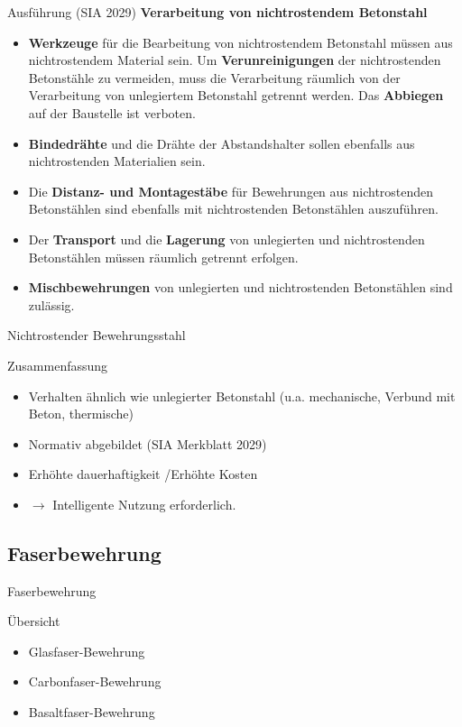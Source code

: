 \begin{frame}{Ausführung (SIA 2029)}
    \textbf{Verarbeitung von nichtrostendem Betonstahl}
    \begin{itemize}
        \item[\textbullet]  \textbf{Werkzeuge} für die Bearbeitung von nichtrostendem Betonstahl müssen aus nichtrostendem Material sein.
              Um \textbf{Verunreinigungen} der nichtrostenden Betonstähle zu vermeiden, muss die Verarbeitung räumlich von der Verarbeitung von unlegiertem Betonstahl getrennt werden. Das \textbf{Abbiegen} auf der Baustelle ist verboten.
        \item[\textbullet]  \textbf{Bindedrähte} und die Drähte der Abstandshalter sollen ebenfalls aus nichtrostenden Materialien sein.
        \item[\textbullet]  Die \textbf{Distanz- und Montagestäbe} für Bewehrungen aus nichtrostenden Betonstählen sind ebenfalls mit nichtrostenden Betonstählen auszuführen.
        \item[\textbullet]  Der \textbf{Transport} und die \textbf{Lagerung} von unlegierten und nichtrostenden Betonstählen müssen räumlich getrennt erfolgen.
        \item[\textbullet]  \textbf{Mischbewehrungen} von unlegierten und nichtrostenden Betonstählen sind zulässig.
    \end{itemize}
\end{frame}

\begin{frame}{Nichtrostender Bewehrungsstahl}
    \begin{block}{Zusammenfassung}
        \begin{itemize}
            \item[\textbullet] Verhalten ähnlich wie unlegierter Betonstahl (u.a. mechanische, Verbund mit Beton, thermische)
            \item[\textbullet]Normativ abgebildet (SIA Merkblatt 2029)
            \item[\textbullet]Erhöhte dauerhaftigkeit /Erhöhte Kosten
            \item[\textbullet] $\rightarrow$ Intelligente Nutzung erforderlich.
        \end{itemize}
    \end{block}
\end{frame}

\subsection{Faserbewehrung}
\begin{frame}{Faserbewehrung}
    \begin{block}{Übersicht}
        \begin{itemize}
            \item[\textbullet]  Glasfaser-Bewehrung
            \item[\textbullet]  Carbonfaser-Bewehrung
            \item[\textbullet]  Basaltfaser-Bewehrung
        \end{itemize}
    \end{block}
\end{frame}

